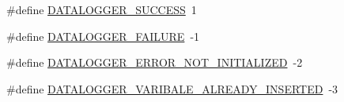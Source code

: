 \begin{DoxyCompactItemize}
\item 
\#define \hyperlink{datalogger_01_07C_xC3_xB3pia_01em_01conflito_01de_01Andr_xC3_xA9_01Carvalho_012013-04-26_08_8h_abddebaf71d26d40183fccbb1a766b983}{D\-A\-T\-A\-L\-O\-G\-G\-E\-R\-\_\-\-S\-U\-C\-C\-E\-S\-S}~1
\item 
\#define \hyperlink{datalogger_01_07C_xC3_xB3pia_01em_01conflito_01de_01Andr_xC3_xA9_01Carvalho_012013-04-26_08_8h_ac52138ca42979f6e1f1d589020ff9f83}{D\-A\-T\-A\-L\-O\-G\-G\-E\-R\-\_\-\-F\-A\-I\-L\-U\-R\-E}~-\/1
\item 
\#define \hyperlink{datalogger_01_07C_xC3_xB3pia_01em_01conflito_01de_01Andr_xC3_xA9_01Carvalho_012013-04-26_08_8h_a60df7fe0e61b757ad6a9db106b0eb43e}{D\-A\-T\-A\-L\-O\-G\-G\-E\-R\-\_\-\-E\-R\-R\-O\-R\-\_\-\-N\-O\-T\-\_\-\-I\-N\-I\-T\-I\-A\-L\-I\-Z\-E\-D}~-\/2
\item 
\#define \hyperlink{datalogger_01_07C_xC3_xB3pia_01em_01conflito_01de_01Andr_xC3_xA9_01Carvalho_012013-04-26_08_8h_ac76269a113d60c063e857d14e4a2f640}{D\-A\-T\-A\-L\-O\-G\-G\-E\-R\-\_\-\-V\-A\-R\-I\-B\-A\-L\-E\-\_\-\-A\-L\-R\-E\-A\-D\-Y\-\_\-\-I\-N\-S\-E\-R\-T\-E\-D}~-\/3
\end{DoxyCompactItemize}
